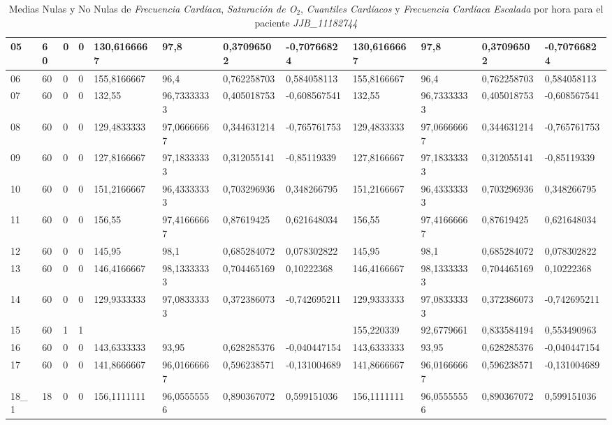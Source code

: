 \begin{landscape}
\begin{table}[!ht]
\begin{tabular}{|l|l|l|l|l|l|l|l|l|l|l|l|}
            05 & 60 & 0 & 0 & 130,6166667 & 97,8 & 0,37096502 & -0,70766824 & 130,6166667 & 97,8 & 0,37096502 & -0,70766824 \\ \hline
            06 & 60 & 0 & 0 & 155,8166667 & 96,4 & 0,762258703 & 0,584058113 & 155,8166667 & 96,4 & 0,762258703 & 0,584058113 \\ \hline
            07 & 60 & 0 & 0 & 132,55 & 96,73333333 & 0,405018753 & -0,608567541 & 132,55 & 96,73333333 & 0,405018753 & -0,608567541 \\ \hline
            08 & 60 & 0 & 0 & 129,4833333 & 97,06666667 & 0,344631214 & -0,765761753 & 129,4833333 & 97,06666667 & 0,344631214 & -0,765761753 \\ \hline
            09 & 60 & 0 & 0 & 127,8166667 & 97,18333333 & 0,312055141 & -0,85119339 & 127,8166667 & 97,18333333 & 0,312055141 & -0,85119339 \\ \hline
            10 & 60 & 0 & 0 & 151,2166667 & 96,43333333 & 0,703296936 & 0,348266795 & 151,2166667 & 96,43333333 & 0,703296936 & 0,348266795 \\ \hline
            11 & 60 & 0 & 0 & 156,55 & 97,41666667 & 0,87619425 & 0,621648034 & 156,55 & 97,41666667 & 0,87619425 & 0,621648034 \\ \hline
            12 & 60 & 0 & 0 & 145,95 & 98,1 & 0,685284072 & 0,078302822 & 145,95 & 98,1 & 0,685284072 & 0,078302822 \\ \hline
            13 & 60 & 0 & 0 & 146,4166667 & 98,13333333 & 0,704465169 & 0,10222368 & 146,4166667 & 98,13333333 & 0,704465169 & 0,10222368 \\ \hline
            14 & 60 & 0 & 0 & 129,9333333 & 97,08333333 & 0,372386073 & -0,742695211 & 129,9333333 & 97,08333333 & 0,372386073 & -0,742695211 \\ \hline
            15 & 60 & 1 & 1 & ~ & ~ & ~ & ~ & 155,220339 & 92,6779661 & 0,833584194 & 0,553490963 \\ \hline
            16 & 60 & 0 & 0 & 143,6333333 & 93,95 & 0,628285376 & -0,040447154 & 143,6333333 & 93,95 & 0,628285376 & -0,040447154 \\ \hline
            17 & 60 & 0 & 0 & 141,8666667 & 96,01666667 & 0,596238571 & -0,131004689 & 141,8666667 & 96,01666667 & 0,596238571 & -0,131004689 \\ \hline
            18\_1 & 18 & 0 & 0 & 156,1111111 & 96,05555556 & 0,890367072 & 0,599151036 & 156,1111111 & 96,05555556 & 0,890367072 & 0,599151036 \\ \hline
        \end{tabular}
        \caption{Medias Nulas y No Nulas de \textit{Frecuencia Cardíaca}, \textit{Saturación de O$_2$}, \textit{Cuantiles Cardíacos} y \textit{Frecuencia Cardíaca Escalada}  por hora para el paciente \textit{JJB\_11182744}}\label{tabla:medias-JJB}
    \end{table}

\end{landscape}
\restoregeometry 

